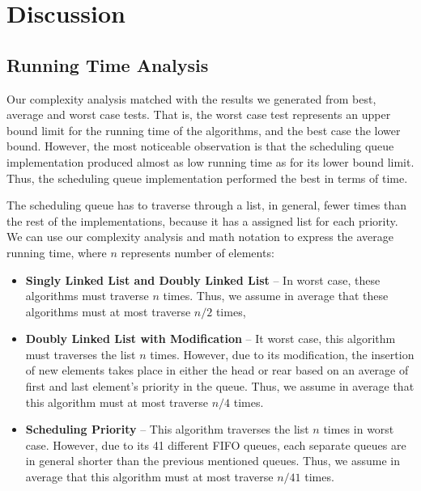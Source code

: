 \documentclass[a4paper,11pt]{kth-mag}
\newcommand*{\skippara}{\par\vspace{\baselineskip} \noindent}
\begin{document}
\section{Discussion}
\subsection{Running Time Analysis}
Our complexity analysis matched with the results we generated from best, average and worst case tests.
That is, the worst case test represents an upper bound limit for the running time of the algorithms, and the best case the lower bound.
However, the most noticeable observation is that the scheduling queue implementation produced almost as low running time as for its lower bound limit.
Thus, the scheduling queue implementation performed the best in terms of time.

\skippara The scheduling queue has to traverse through a list, in general, fewer times than the rest of the implementations, because it has a assigned list for each priority.
We can use our complexity analysis and math notation to express the average running time, where $n$ represents number of elements:
\begin{itemize}
    \item \textbf{Singly Linked List and Doubly Linked List} -- In worst case, these algorithms must traverse $n$ times.
        Thus, we assume in average that these algorithms must at most traverse $n/2$ times,
    \item \textbf{Doubly Linked List with Modification} -- It worst case, this algorithm must traverses the list $n$ times.
        However, due to its modification, the insertion of new elements takes place in either the head or rear based on an average of first and last element's priority in the queue.
        Thus, we assume in average that this algorithm must at most traverse $n/4$ times.
    \item \textbf{Scheduling Priority} -- This algorithm traverses the list $n$ times in worst case.
        However, due to its 41 different FIFO queues, each separate queues are in general shorter than the previous mentioned queues.
        Thus, we assume in average that this algorithm must at most traverse $n/41$ times.
\end{itemize}
\end{document}
